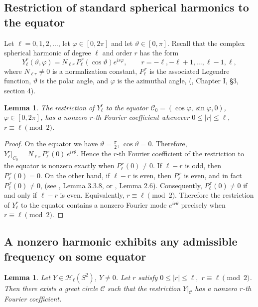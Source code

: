 \documentclass[11pt]{article}
\newtheorem{lemma}[theorem]{Lemma}
\theoremstyle{definition}
\begin{document}
\subsection{Restriction of standard spherical harmonics to the equator}

Let $\ell=0,1,2,\dots$, let $\varphi \in [0,2\pi]$ and let $\vartheta \in [0,\pi]$. Recall that the complex spherical harmonic of degree \(\ell\) and order
\(r\)  has the form
\[
Y_\ell^r(\vartheta,\varphi)
=
N_{\ell r}\,
P_\ell^{\,r}(\cos\vartheta)e^{ir\varphi},\qquad r=-\ell,-\ell+1,\dots,\ell-1,\ell,
\]
where \(N_{\ell r}\neq0\) is a normalization constant,
	 \(P_\ell^{\,r}\) is the associated Legendre function,
 \(\vartheta\) is the polar angle,
and  \(\varphi\) is the azimuthal angle, (\cite{GMS}, Chapter I, \S3, section 4).





\begin{lemma}\label{votono1}
The restriction of $Y_\ell^r$ to  the equator ${\mathcal C}_0=(\cos\varphi,\sin\varphi,0)$, $\varphi\in[0,2\pi]$, has a nonzero \(r\)-th Fourier coefficient  whenever
$0\le |r|\le \ell,$ $r \equiv \ell \pmod 2$.
\end{lemma}
\begin{proof}
On the equator we have
$\vartheta=\frac{\pi}{2}$,
$\cos\vartheta=0$.
Therefore,
$Y_\ell^r|_{C_0}
=
N_{\ell r}\,
P_\ell^{\,r}(0)\,
e^{ir\theta}$.
Hence the \(r\)-th Fourier coefficient of the restriction to the
equator is nonzero exactly when
$P_\ell^{\,r}(0)\neq0$.
If \(\ell-r\) is odd, then 
	$P_\ell^{\,r}(0)=0$.
	On the other hand, if \(\ell-r\) is even, then \(P_\ell^{\,r}\) is even, and in fact
	$P_\ell^{\,r}(0)\neq0$, (see \cite{Gro}, Lemma 3.3.8, or \cite{Sch2}, Lemma 2.6).
Consequently,
$
P_\ell^{\,r}(0)\neq0$ if and only if 
$
\ell-r $ is even.
Equivalently,
$r\equiv \ell \pmod 2$.
Therefore the restriction of \(Y_\ell^r\) to the equator contains a
nonzero Fourier mode \(e^{ir\theta}\) precisely when
$r\equiv \ell \pmod2$.
\end{proof}

\subsection{A nonzero harmonic exhibits any admissible frequency on some equator}

\begin{lemma}\label{l1O1}
	Let \(Y\in\mathcal H_\ell(S^2)\), \(Y\ne0\). Let \(r\) satisfy
	$0\le |r|\le \ell,$ $ r\equiv\ell\pmod2$.
	Then there exists a great circle \({\mathcal C}\) such that the restriction \(Y|_{\mathcal C}\) has a nonzero
	\(r\)-th Fourier coefficient.
\end{lemma}
\end{document}
